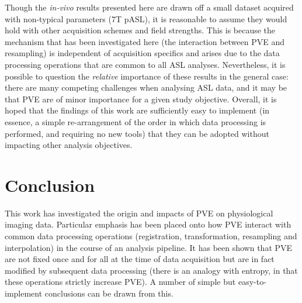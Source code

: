 Though the \textit{in-vivo} results presented here are drawn off a small dataset acquired with non-typical parameters (7T pASL), it is reasonable to assume they would hold with other acquisition schemes and field strengths. This is because the mechanism that has been investigated here (the interaction between PVE and resampling) is independent of acquisition specifics and arises due to the data processing operations that are common to all ASL analyses. Nevertheless, it is possible to question the \textit{relative} importance of these results in the general case: there are many competing challenges when analysing ASL data, and it may be that PVE are of minor importance for a given study objective. Overall, it is hoped that the findings of this work are sufficiently easy to implement (in essence, a simple re-arrangement of the order in which data processing is performed, and requiring no new tools) that they can be adopted without impacting other analysis objectives. 

\section{Conclusion}

This work has investigated the origin and impacts of PVE on physiological imaging data. Particular emphasis has been placed onto how PVE interact with common data processing operations (registration, transformation, resampling and interpolation) in the course of an analysis pipeline. It has been shown that PVE are not fixed once and for all at the time of data acquisition but are in fact modified by subsequent data processing (there is an analogy with entropy, in that these operations strictly increase PVE). A number of simple but easy-to-implement conclusions can be drawn from this. 

